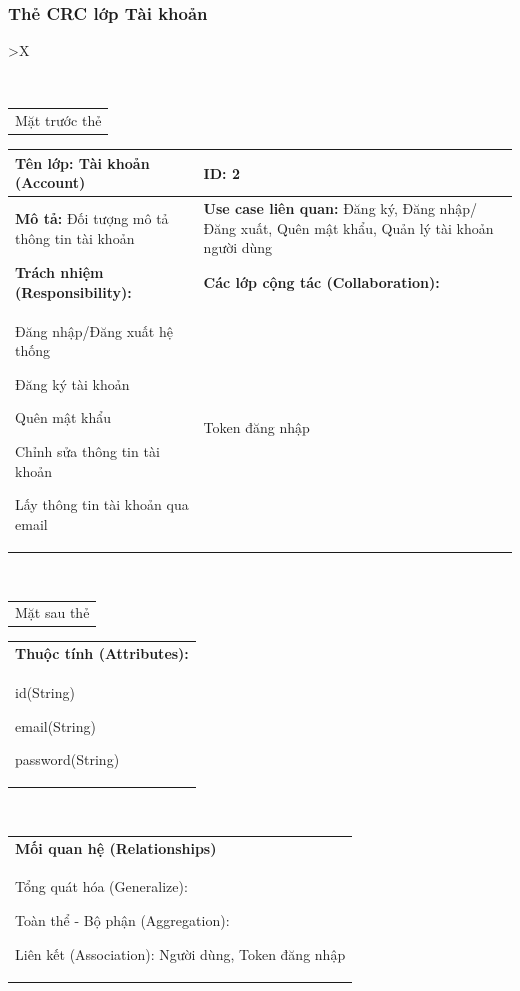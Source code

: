  \subsubsection{Thẻ CRC lớp Tài khoản}
  \begin{xltabular}{\textwidth}{
    >{\centering\arraybackslash}X 
   }
   \caption{\bfseries \fontsize{12pt}{0pt}\selectfont Thẻ CRC lớp Tài khoản}
   \\
   \begin{tabularx}{0.9\textwidth}{X}
     Mặt trước thẻ
   \end{tabularx}
   \begin{tabularx}{0.9\textwidth}{|X|X|}
     \hline
     \textbf{Tên lớp:} Tài khoản (Account) & \textbf{ID:} 2 \\
      \hline
      \textbf{Mô tả:} Đối tượng mô tả thông tin tài khoản & \textbf{Use case liên quan:} Đăng ký, Đăng nhập/Đăng xuất, Quên mật khẩu, Quản lý tài khoản người dùng \\
      \hline
      \textbf{Trách nhiệm (Responsibility):} & \textbf{Các lớp cộng tác (Collaboration):} \\
      Đăng nhập/Đăng xuất hệ thống

      Đăng ký tài khoản

      Quên mật khẩu

      Chỉnh sửa thông tin tài khoản

      Lấy thông tin tài khoản qua email
      & 
      Token đăng nhập
      \\
     \hline
   \end{tabularx}
   \\ 
   \begin{tabularx}{0.9\textwidth}{X}
     Mặt sau thẻ
   \end{tabularx}
   \begin{tabularx}{0.9\textwidth}{|X|}
    \hline
    \textbf{Thuộc tính (Attributes):} \\
    id(String) 
    
    email(String)

    password(String)
    \\
    \hline
  \end{tabularx}
   \\     
   \begin{tabularx}{0.9\textwidth}{|X|}
     \textbf{Mối quan hệ (Relationships)} \\
     Tổng quát hóa (Generalize):  

     Toàn thể - Bộ phận (Aggregation):   
     
     Liên kết (Association): Người dùng, Token đăng nhập      \\
     \hline
   \end{tabularx}
   \end{xltabular}
   

